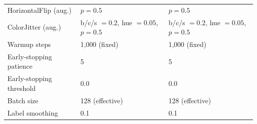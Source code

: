 {\begin{minipage}{\textwidth}
\begin{center}
\begin{tabular}{@{}lll@{}}
        HorizontalFlip (aug.)        & $p=0.5$                            & $p=0.5$                            \\
        ColorJitter (aug.)           & b/c/s $=0.2$, hue $=0.05$, $p=0.5$ & b/c/s $=0.2$, hue $=0.05$, $p=0.5$ \\
        Warmup steps                 & 1,000 (fixed)                      & 1,000 (fixed)                      \\
        Early-stopping patience      & 5                                  & 5                                  \\
        Early-stopping threshold     & 0.0                                & 0.0                                \\
        Batch size                   & 128 (effective)                    & 128 (effective)                    \\
        Label smoothing              & 0.1                                & 0.1                                \\
        \bottomrule
      \end{tabular}
    \end{center}
  \end{minipage}%
}
\par

